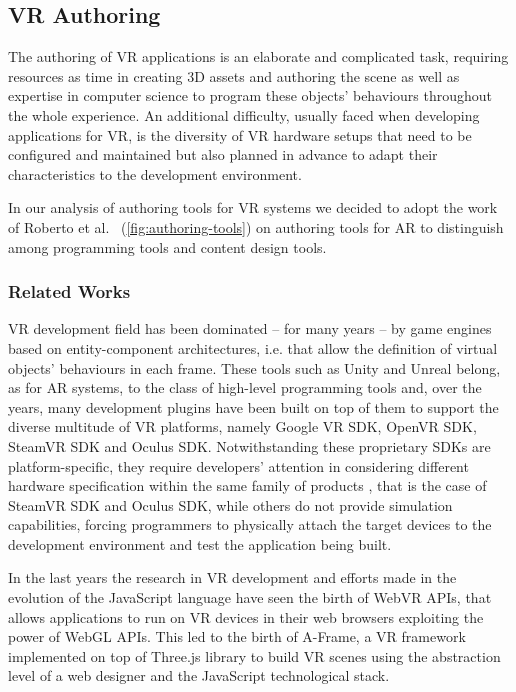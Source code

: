 \subsection{VR Authoring}
\label{subsec:vr-authoring}
The authoring of \gls{VR} applications is an elaborate and complicated task, requiring resources as time in creating 3D assets and authoring the scene as well as expertise in computer science to program these objects' behaviours throughout the whole experience. An additional difficulty, usually faced when developing applications for \gls{VR}, is the diversity of \gls{VR} hardware setups that need to be configured and maintained \cite{perret_polyvr_2014} but also planned in advance to adapt their characteristics to the development environment.

In our analysis of authoring tools for \gls{VR} systems we decided to adopt the work of Roberto et al.~\cite{marcus_authoring_2016} (\autoref{fig:authoring-tools}) on authoring tools for \gls{AR} to distinguish among programming tools and content design tools.

\subsubsection{Related Works}
\label{subsun:vr-relatedw}
VR development field has been dominated -- for many years -- by game engines based on entity-component architectures, i.e. that allow the definition of virtual objects' behaviours in each frame. These tools such as Unity and Unreal belong, as for \gls{AR} systems, to the class of high-level programming tools and, over the years, many development plugins have been built on top of them to support the diverse multitude of \gls{VR} platforms, namely Google VR SDK, OpenVR SDK, SteamVR SDK and Oculus SDK.
Notwithstanding these proprietary \glspl{SDK} are platform-specific, they require developers' attention in considering different hardware specification within the same family of products \cite{trentsios_comparing_2020}, that is the case of SteamVR SDK and Oculus SDK, while others do not provide simulation capabilities, forcing programmers to physically attach the target devices to the development environment and test the application being built.

In the last years the research in VR development and efforts made in the evolution of the JavaScript language have seen the birth of WebVR \glspl{API}, that allows applications to run on VR devices in their web browsers exploiting the power of WebGL \glspl{API}. This led to the birth of A-Frame, a \gls{VR} framework implemented on top of Three.js library to build VR scenes using the abstraction level of a web designer and the JavaScript technological stack.

